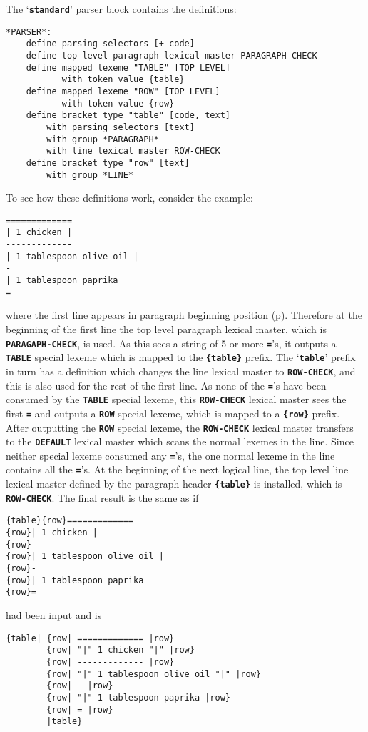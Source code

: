 \documentclass[12pt]{article}
\newcommand{\TT}[1]{{\tt \bfseries #1}}
\newcommand{\pagref}[1]{p\pageref{#1}}
\newenvironment{indpar}[1][0.3in]%
	{\begin{list}{}%
		     {\setlength{\itemsep}{0in}%
		      \setlength{\topsep}{0in}%
		      \setlength{\parsep}{1ex}%
		      \setlength{\labelwidth}{#1}%
		      \setlength{\leftmargin}{#1}%
		      \addtolength{\leftmargin}{\labelsep}}%
	 \item}%
	{\end{list}}
\begin{document}
The `\TT{standard}' parser block contains the definitions:
\begin{indpar}\begin{verbatim}
*PARSER*:
    define parsing selectors [+ code]
    define top level paragraph lexical master PARAGRAPH-CHECK
    define mapped lexeme "TABLE" [TOP LEVEL]
           with token value {table}
    define mapped lexeme "ROW" [TOP LEVEL]
           with token value {row}
    define bracket type "table" [code, text]
        with parsing selectors [text]
        with group *PARAGRAPH*
        with line lexical master ROW-CHECK
    define bracket type "row" [text]
        with group *LINE*
\end{verbatim}\end{indpar}

To see how these definitions work, consider the example:
\begin{indpar}\begin{verbatim}
=============
| 1 chicken |
-------------
| 1 tablespoon olive oil |
-
| 1 tablespoon paprika
=
\end{verbatim}\end{indpar}
where the first line appears in paragraph beginning position
(\pagref{PARAGRAPH-BEGINNING-POSITION}).
Therefore at the beginning of the first line the top level
paragraph lexical master, which is \TT{PARAGAPH-CHECK}, is used.
As this
sees a string of 5 or more \TT{=}'s, it outputs a \TT{TABLE}
special lexeme which is mapped to the \TT{\{table\}} prefix.
The `\TT{table}' prefix in turn has a definition which
changes the line lexical master to \TT{ROW-CHECK}, and this
is also used for the rest of the first line.  As none
of the \TT{=}'s have been consumed by the \TT{TABLE} special
lexeme, this \TT{ROW-CHECK} lexical master sees the first \TT{=} and
outputs a \TT{ROW} special lexeme, which is mapped to a
\TT{\{row\}} prefix.  After outputting the \TT{ROW} special
lexeme, the \TT{ROW-CHECK} lexical master transfers to the
\TT{DEFAULT} lexical master which scans the normal lexemes
in the line.  Since neither special lexeme consumed any \TT{=}'s,
the one normal lexeme in the line contains all the
\TT{=}'s.  At the beginning of the next logical line, the
top level line lexical master defined by the paragraph header
\TT{\{table\}} is installed, which is
\TT{ROW-CHECK}.  The final result is the same as if
\begin{indpar}\begin{verbatim}
{table}{row}=============
{row}| 1 chicken |
{row}-------------
{row}| 1 tablespoon olive oil |
{row}-
{row}| 1 tablespoon paprika
{row}=
\end{verbatim}\end{indpar}
had been input and is
\begin{indpar}\begin{verbatim}
{table| {row| ============= |row}
        {row| "|" 1 chicken "|" |row}
        {row| ------------- |row}
        {row| "|" 1 tablespoon olive oil "|" |row}
        {row| - |row}
        {row| "|" 1 tablespoon paprika |row}
        {row| = |row}
        |table}
\end{verbatim}\end{indpar}
\end{document}
